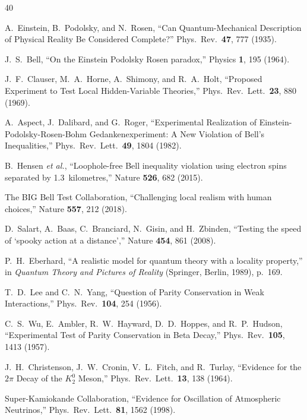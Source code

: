 \documentclass[prl,twocolumn,superscriptaddress,floatfix]{revtex4-2}
\begin{document}
\begin{thebibliography}{40}

  A.~Einstein, B.~Podolsky, and N.~Rosen,
  ``Can Quantum-Mechanical Description of Physical Reality Be
  Considered Complete?''
  Phys.\ Rev.\ \textbf{47}, 777 (1935).

  J.~S.~Bell,
  ``On the Einstein Podolsky Rosen paradox,''
  Physics \textbf{1}, 195 (1964).

  J.~F.~Clauser, M.~A.~Horne, A.~Shimony, and R.~A.~Holt,
  ``Proposed Experiment to Test Local Hidden-Variable Theories,''
  Phys.\ Rev.\ Lett.\ \textbf{23}, 880 (1969).

  A.~Aspect, J.~Dalibard, and G.~Roger,
  ``Experimental Realization of Einstein-Podolsky-Rosen-Bohm
  Gedankenexperiment: A New Violation of Bell's Inequalities,''
  Phys.\ Rev.\ Lett.\ \textbf{49}, 1804 (1982).

  B.~Hensen \textit{et al.},
  ``Loophole-free Bell inequality violation using electron spins
  separated by 1.3~kilometres,''
  Nature \textbf{526}, 682 (2015).

  The BIG Bell Test Collaboration,
  ``Challenging local realism with human choices,''
  Nature \textbf{557}, 212 (2018).

  D.~Salart, A.~Baas, C.~Branciard, N.~Gisin, and H.~Zbinden,
  ``Testing the speed of `spooky action at a distance',''
  Nature \textbf{454}, 861 (2008).

  P.~H.~Eberhard,
  ``A realistic model for quantum theory with a locality property,''
  in \emph{Quantum Theory and Pictures of Reality}
  (Springer, Berlin, 1989), p.~169.

  T.~D.~Lee and C.~N.~Yang,
  ``Question of Parity Conservation in Weak Interactions,''
  Phys.\ Rev.\ \textbf{104}, 254 (1956).

  C.~S.~Wu, E.~Ambler, R.~W.~Hayward, D.~D.~Hoppes, and R.~P.~Hudson,
  ``Experimental Test of Parity Conservation in Beta Decay,''
  Phys.\ Rev.\ \textbf{105}, 1413 (1957).

  J.~H.~Christenson, J.~W.~Cronin, V.~L.~Fitch, and R.~Turlay,
  ``Evidence for the $2\pi$ Decay of the $K_2^0$ Meson,''
  Phys.\ Rev.\ Lett.\ \textbf{13}, 138 (1964).

  Super-Kamiokande Collaboration,
  ``Evidence for Oscillation of Atmospheric Neutrinos,''
  Phys.\ Rev.\ Lett.\ \textbf{81}, 1562 (1998).


\end{thebibliography}
\end{document}
